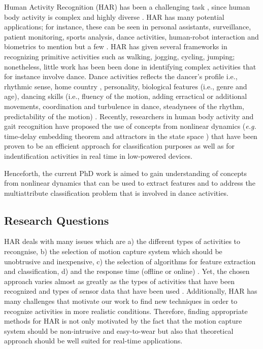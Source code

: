 \documentclass{sigchi}
\begin{document}
Human Activity Recognition (HAR) has been a challenging task \cite{Aggarwal2004}, 
since human body activity is complex and highly diverse \cite{Kim2010}.
HAR has many potential applications; for instance, these can be seen in personal 
assistants, surveillance, patient monitoring, sports analysis, dance activities, 
human-robot interaction and biometrics to mention but a few \cite{Aggarwal2011}. 
HAR has given several frameworks in recognizing primitive activities 
such as walking, jogging, cycling, jumping; nonetheless, little work has been been
done in identifying complex activities that for instance involve dance. 
Dance activities reflects the dancer's profile i.e., rhythmic sense, 
home country \cite{Iwai2011}, personality, biological features (i.e., genre and age),
dancing skills (i.e., fluency of the motion, adding erractical or additional movements,
coordination and turbulence in dance, steadynees of the rhythm, predictability of 
the motion) \cite{GrammerK.ElisabethOberzaucher2011}.
Recently, researchers in human body activity and gait recognition have proposed
the use of concepts from nonlinear dynamics (\textit{e.g.}
time-delay embedding theorem \cite{J.FrankS.Mannor2010,Sama2013}
and attractors in the state space \cite{Akiduki2013,Akiduki2014}) 
that have been proven to be an efficient approach 
for classification purposes as well as for indentification activities 
in real time in low-powered devices. 

Henceforth, the current PhD work is aimed to gain understanding of 
concepts from nonlinear dynamics that can be used to extract features and
to address the multiattribute classification problem that is involved 
in dance activities.

\subsection{Research Questions}
HAR deals with many issues which are
a) the different types of activities to recongnise,
b) the selection of motion capture system which should be unobtrusive and inexpensive,
c) the selection of algorithms for feature extraction and classification,
d) and the response time (offline or online) \cite{Lara2013}.
Yet, the chosen approach varies almost as greatly as the types of activities 
that have been recognized and types of sensor data that have been used 
\cite{Kim2010}. 
Additionally, HAR has many challenges that motivate our work 
to find new techniques in order to recognize activities in more realistic conditions. 
Therefore, finding appropriate methods for HAR is not only motivated by the 
fact that the motion capture system should be non-intrusive and easy-to-wear
but also that theoretical approach should be well suited for real-time applications.
\end{document}

